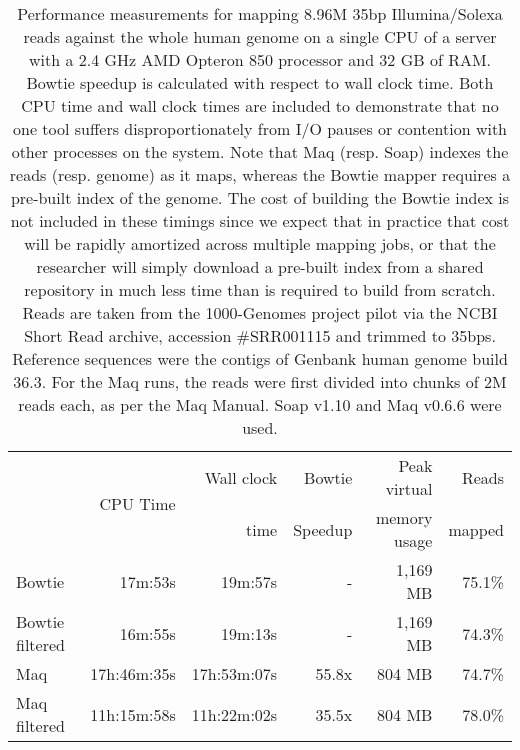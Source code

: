 \documentclass[letterpaper]{article}
\begin{document}
\begin{table}[tp]
\scriptsize
\begin{tabular}{lrrrrr}
\toprule
 & \multirow{2}{*}{CPU Time} & Wall clock & Bowtie  & Peak virtual & Reads  \\
 &                            & time       & Speedup & memory usage & mapped \\[3pt]
\toprule
\midrule
Bowtie & 17m:53s & 19m:57s & - & 1,169 MB & 75.1\%\\\midrule
Bowtie filtered & 16m:55s & 19m:13s & - & 1,169 MB & 74.3\%\\\midrule
Maq & 17h:46m:35s & 17h:53m:07s & 55.8x & 804 MB & 74.7\%\\\midrule
Maq filtered & 11h:15m:58s & 11h:22m:02s & 35.5x & 804 MB & 78.0\%\\
\bottomrule
\end{tabular}
\caption{Performance measurements for mapping 8.96M 35bp Illumina/Solexa reads against the whole human genome on a single CPU of a server with a 2.4 GHz AMD Opteron 850 processor and 32 GB of RAM. Bowtie speedup is calculated with respect to wall clock time. Both CPU time and wall clock times are included to demonstrate that no one tool suffers disproportionately from I/O pauses or contention with other processes on the system. Note that Maq (resp. Soap) indexes the reads (resp. genome) as it maps, whereas the Bowtie mapper requires a pre-built index of the genome.  The cost of building the Bowtie index is not included in these timings since we expect that in practice that cost will be rapidly amortized across multiple mapping jobs, or that the researcher will simply download a pre-built index from a shared repository in much less time than is required to build from scratch. Reads are taken from the 1000-Genomes project pilot via the NCBI Short Read archive, accession \#SRR001115 and trimmed to 35bps. Reference sequences were the contigs of Genbank human genome build 36.3. For the Maq runs, the reads were first divided into chunks of 2M reads each, as per the Maq Manual. Soap v1.10 and Maq v0.6.6 were used. }
\end{table}
\end{document}
